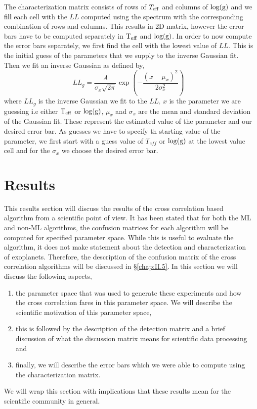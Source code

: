 The characterization matrix consists of rows of $T_{\rm{eff}}$ and columns of $\rm{\log(g)}$ and we fill each cell with the $LL$ computed using the spectrum with the corresponding combination of rows and columns.
This results in 2D matrix, however the error bars have to be computed separately in $\rm{T_{eff}}$ and $\rm{\log(g)}$.
In order to now compute the error bars separately, we first find the cell with the lowest value of $LL$.
This is the initial guess of the parameters that we supply to the inverse Gaussian fit.
Then we fit an inverse Gaussian as defined by,
\begin{equation}
    LL_{g} = \dfrac{A}{\sigma_{x}\sqrt{2\pi}}\exp{\left(-\dfrac{(x-\mu_x)^2}{2\sigma_{x}^2}\right)}
    \label{eq: gaussian fit LL}
\end{equation}
where $LL_g$ is the inverse Gaussian we fit to the $LL$, $x$ is the parameter we are guessing i.e either $\rm{T_{eff}}$ or $\rm{\log(g)}$,
$\mu_x$ and $\sigma_x$ are the mean and standard deviation of the Gaussian fit.
These represent the estimated value of the parameter and our desired error bar.
As guesses we have to specify th starting value of the parameter, we first start with a guess value of $T_{eff}$ or $\rm{\log(g)}$ at the lowest value cell and for the $\sigma_x$ we choose the desired error bar.

\section{Results}
This results section will discuss the results of the cross correlation based algorithm from a scientific point of view.
It has been stated that for both the ML and non-ML algorithms, the confusion matrices for each algorithm will be computed for specified parameter space. 
While this is useful to evaluate the algorithm, it does not make statement about the detection and characterization of exoplanets.
Therefore, the description of the confusion matrix of the cross correlation algorithms will be discussed in \S\ref{chap:II.5}.
In this section we will discuss the following aspects,
\begin{enumerate}
    \item the parameter space that was used to generate these experiments and how the cross correlation fares in this parameter space. We will describe the scientific motivation of this parameter space, 
    \item this is followed by the description of the detection matrix and a brief discussion of what the discussion matrix means for scientific data processing and
    \item finally, we will describe the error bars which we were able to compute using the characterization matrix.
\end{enumerate}
We will wrap this section with implications that these results mean for the scientific community in general.
